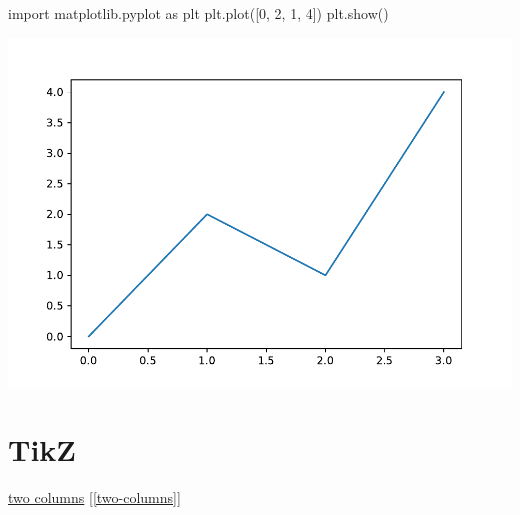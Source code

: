 \documentclass[
]{book}
\newenvironment{Shaded}{\begin{snugshade}}{\end{snugshade}}
\newcommand{\CommentTok}[1]{\textcolor[rgb]{0.56,0.35,0.01}{\textit{#1}}}
\newcommand{\DecValTok}[1]{\textcolor[rgb]{0.00,0.00,0.81}{#1}}
\newcommand{\ImportTok}[1]{#1}
\newcommand{\NormalTok}[1]{#1}
\theoremstyle{definition}
\theoremstyle{definition}
\theoremstyle{definition}
\theoremstyle{definition}
\theoremstyle{remark}
\begin{document}
\begin{Shaded}
\end{Shaded}

\begin{Shaded}
\begin{Highlighting}[]
\ImportTok{import}\NormalTok{ matplotlib.pyplot }\ImportTok{as}\NormalTok{ plt}
\NormalTok{plt.plot([}\DecValTok{0}\NormalTok{, }\DecValTok{2}\NormalTok{, }\DecValTok{1}\NormalTok{, }\DecValTok{4}\NormalTok{])}
\NormalTok{plt.show()}
\end{Highlighting}
\end{Shaded}

\includegraphics{202401292317-Python_files/figure-latex/unnamed-chunk-8-1.pdf}

\hypertarget{tikz}{%
\chapter{TikZ}\label{tikz}}

\protect\hyperlink{two-columns}{two columns} {[}\ref{two-columns}{]}
\end{document}
